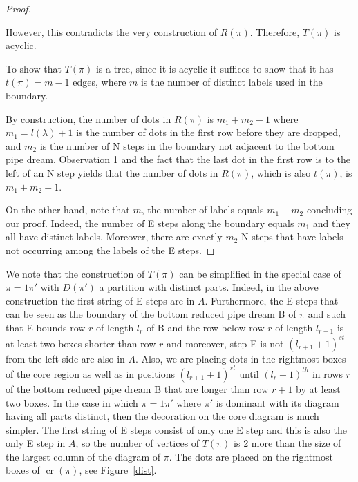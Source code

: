 \documentclass[ALCO,ThmDefs]{cedram}
\numberwithin{equation}{section}
\DeclareMathOperator{\rmcr}{cr}
\newcommand*\+{\smash{\lower2pt\hbox{\rlap{\vrule height14pt}}\raise2pt\hbox{\rlap{\hskip-3pt \vrule height.4pt depth0pt width14.7pt}}}}
\begin{document}
\begin{proof}
\begin{center}
\end{center}
However, this contradicts the very construction of $R(\pi)$. Therefore, $T(\pi)$ is acyclic.

To show that $T(\pi)$ is a tree, since it is acyclic it suffices to show that it has $t(\pi)=m-1$ edges, where $m$ is the number of distinct labels used in the boundary. 

By construction, the number of dots in $R(\pi)$ is $m_1+m_2-1$ where $m_1=l(\lambda)+1$ is the number of dots in the first row before they are dropped, and $m_2$ is the number of N steps in the boundary not adjacent to the bottom pipe dream. {Observation 1} and the fact that the last dot in the first row is to the left of an N step yields that the number of dots in $R(\pi)$, which is also $t(\pi)$, is $m_1+m_2-1$.

On the other hand, note that $m$, the number of labels equals $m_1+m_2$ concluding our proof. Indeed, the number of E steps along the boundary equals $m_1$ and they all have distinct labels. Moreover, there are exactly $m_2$ N steps that have labels not occurring among the labels of the E steps.
\end{proof}

\begin{rema}
We note that the construction of $T(\pi)$ can be simplified in the special case of $\pi=1\pi'$ with $D(\pi')$ a partition with distinct parts. Indeed, in the above construction the first string of E steps are in $A$. Furthermore, the E steps that can be seen as the boundary of the bottom reduced pipe dream B of $\pi$ and such that E bounds row $r$ of length $l_r$ of B and the row below row $r$ of length $l_{r+1}$ is at least two boxes shorter than row $r$ and moreover, step E is not $(l_{r+1}+1)^{st}$ from the left side are also in $A$. Also, we are placing dots in the rightmost boxes of the core region as well as in positions $(l_{r+1}+1)^{st}$ until $(l_r-1)^{th}$ in rows $r$ of the bottom reduced pipe dream B that are longer than row $r+1$ by at least two boxes. In the case in which $\pi=1\pi'$ where $\pi'$ is dominant with its diagram having all parts distinct, then the decoration on the core diagram is much simpler. The first string of E steps consist of only one E step and this is also the only E step in $A$, so the number of vertices of $T(\pi)$ is 2 more than the size of the largest column of the diagram of $\pi$. The dots are placed on the rightmost boxes of $\rmcr(\pi)$, see Figure~\ref{dist}.
\end{rema}
\end{document}
